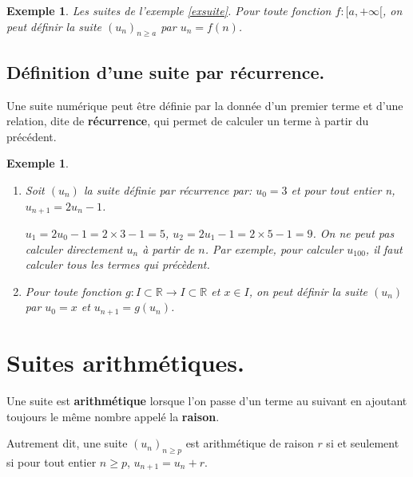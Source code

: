 \documentclass[a4paper,11pt]{article}
\theoremstyle{break}
\newcounter{enonce}
\newtheorem{exemple}[enonce]{Exemple}
\begin{document}
   \begin{exemple}
   
   Les suites de l'exemple \ref{exsuite}. Pour toute fonction $f:[a,+\infty[$, on peut définir la suite
   $(u_n)_{n \geq a}$ par $u_n=f(n)$.
   
  \end{exemple}
  
   \subsection{Définition d'une suite par récurrence.}
  
   \begin{theorem}
      Une suite numérique peut être définie par la donnée d'un premier terme
      et d'une relation, dite de \textbf{récurrence}, qui permet de calculer 
      un terme à partir du précédent.
   \end{theorem}
   
    \begin{exemple}
    \begin{enumerate}
    \item
    Soit $(u_n)$ la suite définie par récurrence par: $u_0=3$ et pour tout entier n, $u_{n+1}=2u_n-1$.

  $u_1=2u_0-1=2 \times 3-1=5$, $u_2=2 u_1-1=2 \times 5-1=9$. On ne peut pas calculer
  directement $u_n$ à partir de $n$. Par exemple, pour calculer $u_{100}$, il 
  faut calculer tous les termes qui précèdent.
  
  \item Pour toute fonction $g:I \subset \mathbb{R}
  \to I \subset \mathbb{R}$ et $x \in I$, on peut définir la suite $(u_n)$ par $u_0=x$ et $u_{n+1}=g(u_n)$.
  \end{enumerate}
  
   \end{exemple}
   \newpage
  
  \section{Suites arithmétiques.}
  \begin{definition} 
    
   Une suite est \textbf{arithmétique} lorsque l'on passe d'un terme au suivant en ajoutant toujours le même nombre
   appelé la \textbf{raison}.
   
   Autrement dit, une suite $(u_n)_{n \geq p}$ est arithmétique de raison $r$ si et seulement si 
   pour tout entier $n \geq p$, $u_{n+1}=u_n+r$.
   \end{definition}
   
\end{document}
